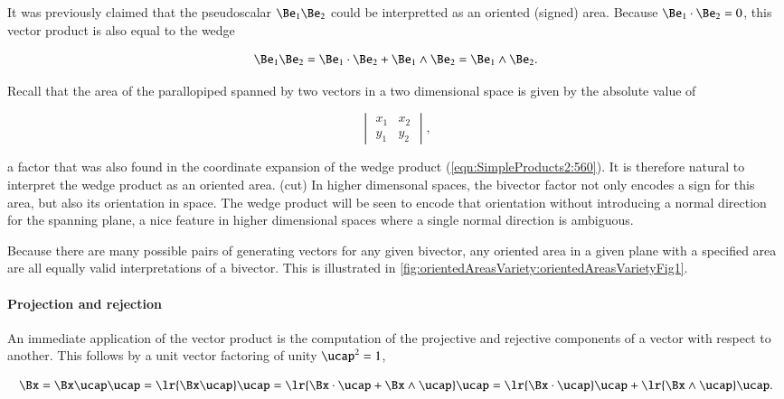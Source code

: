 It was previously claimed that the pseudoscalar \( \Be_1 \Be_2 \) could be interpretted as an oriented (signed) area.
Because \( \Be_1 \cdot \Be_2 = 0 \), this vector product is also equal to the wedge

\begin{dmath}\label{eqn:SimpleProducts2:640}
\Be_1 \Be_2 = \Be_1 \cdot \Be_2 +
\Be_1 \wedge \Be_2
=
\Be_1 \wedge \Be_2.
\end{dmath}

Recall that the area of the parallopiped spanned by two vectors in a two dimensional space is given by the absolute value of

\begin{dmath}\label{eqn:SimpleProducts2:660}
\begin{vmatrix}
   x_1 & x_2 \\
   y_1 & y_2
\end{vmatrix},
\end{dmath}

a factor that was also found in the coordinate expansion of the wedge product (\cref{eqn:SimpleProducts2:560}).
It is therefore natural to interpret the wedge product as an oriented area.
(cut)
In higher dimensonal spaces, the bivector factor not only encodes a sign for this area, but also its orientation in space.
The wedge product will be seen to encode that orientation without introducing a normal direction for the spanning plane, a nice feature in higher dimensional spaces where a single normal direction is ambiguous.

Because there are many possible pairs of generating vectors for any given bivector, any oriented area in a given plane with a specified area are all equally valid interpretations of a bivector.
This is illustrated in \cref{fig:orientedAreasVariety:orientedAreasVarietyFig1}.

\paragraph{Projection and rejection}

An immediate application of the vector product is the computation of the projective and rejective components of a vector with respect to another.
This follows by a unit vector factoring of unity \( \ucap^2 = 1 \),

\begin{dmath}\label{eqn:SimpleProducts2:680}
\Bx =
\Bx \ucap \ucap
=
\lr{ \Bx \ucap } \ucap
=
\lr{ \Bx \cdot \ucap + \Bx \wedge \ucap } \ucap
=
\lr{ \Bx \cdot \ucap } \ucap + \lr{ \Bx \wedge \ucap } \ucap.
\end{dmath}

